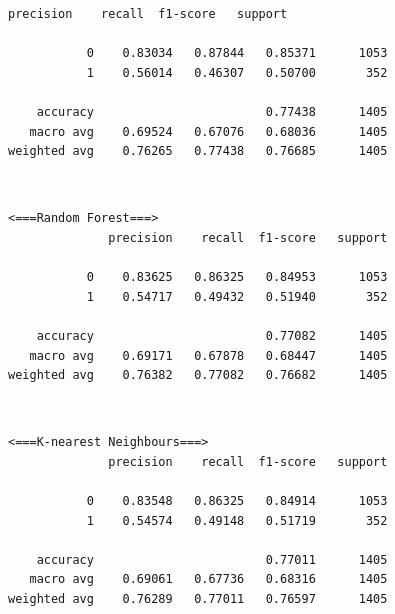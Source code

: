 \documentclass[11pt]{article}
\begin{document}
    \begin{Verbatim}[commandchars=\\\{\}]
              precision    recall  f1-score   support

           0    0.83034   0.87844   0.85371      1053
           1    0.56014   0.46307   0.50700       352

    accuracy                        0.77438      1405
   macro avg    0.69524   0.67076   0.68036      1405
weighted avg    0.76265   0.77438   0.76685      1405

    \end{Verbatim}

    \begin{center}
    \end{center}
    { \hspace*{\fill} \\}
    
    \begin{Verbatim}[commandchars=\\\{\}]
 <===Random Forest===>
              precision    recall  f1-score   support

           0    0.83625   0.86325   0.84953      1053
           1    0.54717   0.49432   0.51940       352

    accuracy                        0.77082      1405
   macro avg    0.69171   0.67878   0.68447      1405
weighted avg    0.76382   0.77082   0.76682      1405

    \end{Verbatim}

    \begin{center}
    \end{center}
    { \hspace*{\fill} \\}
    
    \begin{Verbatim}[commandchars=\\\{\}]
 <===K-nearest Neighbours===>
              precision    recall  f1-score   support

           0    0.83548   0.86325   0.84914      1053
           1    0.54574   0.49148   0.51719       352

    accuracy                        0.77011      1405
   macro avg    0.69061   0.67736   0.68316      1405
weighted avg    0.76289   0.77011   0.76597      1405

    \end{Verbatim}
\end{document}
